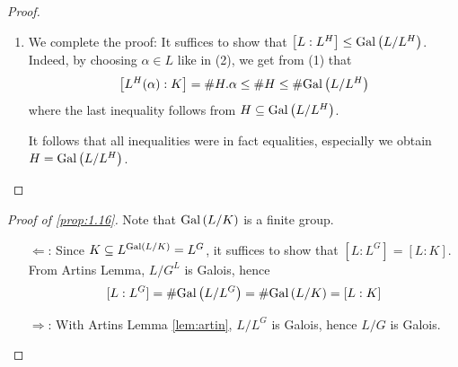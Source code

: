 \documentclass[twoside = false,	%
		headsepline,		%
		parskip = true,
		]{scrbook}						%
\begin{document}
\begin{proof}
\begin{enumerate}
                It suffices to show that $L\subseteq L^H(\alpha)$. For this fix an arbitrary $\beta\in L$ and consider the extension $L^H(\alpha,\beta)/L^H$. This extension is finite and separable (it is generated by separable elements). Now we can apply the primitive element theorem (Proposition 16(iii) in \cite{Cobra}), which gives $\gamma\in L$ with $K(\alpha)=K(\alpha,\beta)$. Because of the maximality property of $\alpha$, we have that $\gamma$ is already in $L^H(\alpha)$. The same must then be true for $\beta$. As a consequence, the extension $L/K$ is finite.
                \item We complete the proof: It suffices to show that $\left[ L:L^H\right]\leq\mathrm{Gal}\left( L/L^H\right)$. Indeed, by choosing $\alpha\in L$ like in (2), we get from (1) that
                 $$\left[ L^H(\alpha):K\right]=\#H.\alpha\leq \#H\leq \#\mathrm{Gal}\left( L/L^H\right)$$
                where the last inequality follows from $H\subseteq \mathrm{Gal}\left( L/L^H\right)$. 
                
                It follows that all inequalities were in fact equalities, especially we obtain $H=\mathrm{Gal}\left( L/L^H\right)$.
            \end{enumerate}
        \end{proof}
        \begin{proof}[Proof of \ref{prop:1.16}]
            Note that $\mathrm{Gal}\left( L/K\right)$ is a finite group.
            \begin{enumerate}
                \item [$\Leftarrow$:] Since $K\subseteq L^{\mathrm{Gal}\left( L/K\right)}=L^G$, it suffices to show that $[L:L^G]=[L:K]$. From Artins Lemma, $L/G^L$ is Galois, hence $$[L:L^G]=\#\mathrm{Gal}\left( L/L^G\right)=\#\mathrm{Gal}\left( L/K\right)=[L:K]$$
                \item [$\Rightarrow$:] With Artins Lemma \ref{lem:artin}, $L/L^G$ is Galois, hence $L/G$ is Galois.
            \end{enumerate}
        \end{proof}
\end{document}
